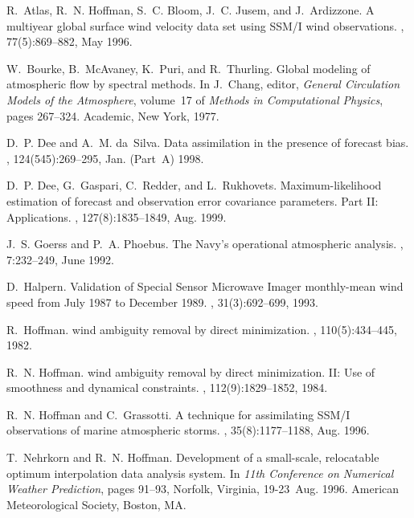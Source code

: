 \documentclass[11pt]{article}
\begin{document}
\begin{thebibliography}{10}

R.~Atlas, R.~N. Hoffman, S.~C. Bloom, J.~C. Jusem, and J.~Ardizzone.
\newblock A multiyear global surface wind velocity data set using {SSM/I} wind
  observations.
, 77(5):869--882, May 1996.

W.~Bourke, B.~McAvaney, K.~Puri, and R.~Thurling.
\newblock Global modeling of atmospheric flow by spectral methods.
\newblock In J.~Chang, editor, {\em General Circulation Models of the
  Atmosphere}, volume~17 of {\em Methods in Computational Physics}, pages
  267--324. Academic, New York, 1977.

D.~P. Dee and A.~M. da~Silva.
\newblock Data assimilation in the presence of forecast bias.
, 124(545):269--295, Jan. (Part~A)
  1998.

D.~P. Dee, G.~Gaspari, C.~Redder, and L.~Rukhovets.
\newblock Maximum-likelihood estimation of forecast and observation error
  covariance parameters. {Part II}: Applications.
, 127(8):1835--1849, Aug. 1999.

J.~S. Goerss and P.~A. Phoebus.
\newblock The {Navy}'s operational atmospheric analysis.
, 7:232--249, June 1992.

D.~Halpern.
\newblock Validation of {Special Sensor Microwave Imager} monthly-mean wind
  speed from {July} 1987 to {December} 1989.
, 31(3):692--699, 1993.

R.~Hoffman.
 wind ambiguity removal by direct minimization.
, 110(5):434--445, 1982.

R.~N. Hoffman.
 wind ambiguity removal by direct minimization. {II}: Use of
  smoothness and dynamical constraints.
, 112(9):1829--1852, 1984.

R.~N. Hoffman and C.~Grassotti.
\newblock A technique for assimilating {SSM/I} observations of marine
  atmospheric storms.
, 35(8):1177--1188, Aug. 1996.

T.~Nehrkorn and R.~N. Hoffman.
\newblock Development of a small-scale, relocatable optimum interpolation data
  analysis system.
\newblock In {\em 11th Conference on Numerical Weather Prediction}, pages
  91--93, Norfolk, Virginia, 19-23~Aug. 1996. American Meteorological Society,
  Boston, MA.


\end{thebibliography}
\end{document}
